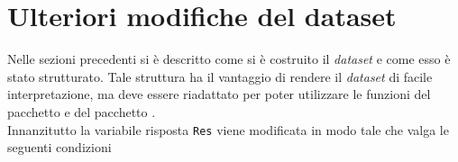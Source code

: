 \begin{comment}
	
	
	\section{Ulteriori modifiche del dataset}
	
	Nelle sezioni precedenti si è descritto come si è costruito il dataset e come esso è stato strutturato. Tale struttura ha il vantaggio di rendere il dataset di facile interpretazione, ma deve essere riadattato per poter utilizzare le funzioni del pacchetto \texttt{BradleyTerry2}.\\ 
	Sono state apportare le seguenti modifiche.\\
	
	Innanzitutto il modello richiede che le due variabili \texttt{Team} e \texttt{Vs} siano di tipo fattore oppure costituiscano un \textsf{data.frame}. Un \textsf{data.frame} è una raccolta di vettori di osservazioni, che devono avere tutti la stessa lunghezza, ma possono essere di tipo diverso: variabili nominali (fattori) o variabili numeriche.
	Le variabili \textsf{Team} e \textsf{Vs} sono state trasformate in \texttt{data.frame} in modo da poter inserire al loro interno tutte le covariate descritte nella sezione precedente.
	
	Inoltre i valori della variabile \texttt{AtHome} sono stati converti in 1 (se \texttt{TRUE}) mentre in 0 (se \texttt{FALSE}).
	
\end{comment}

\section{Ulteriori modifiche del dataset}

Nelle sezioni precedenti si è descritto come si è costruito il \emph{dataset} e come esso è stato strutturato. Tale struttura ha il vantaggio di rendere il \emph{dataset} di facile interpretazione, ma deve essere riadattato per poter utilizzare le funzioni del pacchetto \textit{\cite{bt2}} e del pacchetto \textit{\cite{btl}}.\\ 
Innanzitutto la variabile risposta \texttt{Res} viene modificata in modo tale che valga le seguenti condizioni

